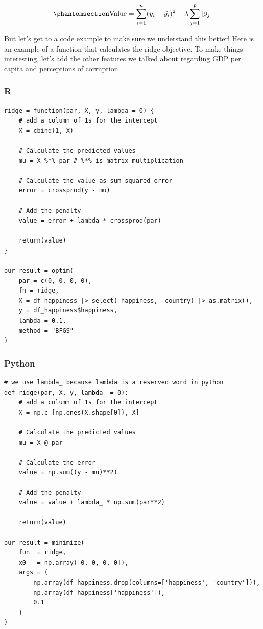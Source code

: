\documentclass[
  letterpaper,
]{krantz}
\begin{document}
\begin{equation}\phantomsection\label{eq-estim-lasso}{
\textrm{Value} = \sum_{i=1}^{n} (y_i - \hat{y_i})^2 + \lambda \sum_{j=1}^{p} |\beta_j|
}\end{equation}

But let's get to a code example to make sure we understand this better!
Here is an example of a function that calculates the ridge objective. To
make things interesting, let's add the other features we talked about
regarding GDP per capita and perceptions of corruption.

\subsubsection{R}

\begin{verbatim}
ridge = function(par, X, y, lambda = 0) {
    # add a column of 1s for the intercept
    X = cbind(1, X)

    # Calculate the predicted values
    mu = X %*% par # %*% is matrix multiplication

    # Calculate the value as sum squared error
    error = crossprod(y - mu)

    # Add the penalty
    value = error + lambda * crossprod(par)

    return(value)
}

our_result = optim(
    par = c(0, 0, 0, 0),
    fn = ridge,
    X = df_happiness |> select(-happiness, -country) |> as.matrix(),
    y = df_happiness$happiness,
    lambda = 0.1,
    method = "BFGS"
)
\end{verbatim}

\subsubsection{Python}

\begin{verbatim}
# we use lambda_ because lambda is a reserved word in python
def ridge(par, X, y, lambda_ = 0):
    # add a column of 1s for the intercept
    X = np.c_[np.ones(X.shape[0]), X]

    # Calculate the predicted values
    mu = X @ par
    
    # Calculate the error
    value = np.sum((y - mu)**2)
    
    # Add the penalty
    value = value + lambda_ * np.sum(par**2)
    
    return(value)

our_result = minimize(
    fun  = ridge,
    x0   = np.array([0, 0, 0, 0]),
    args = (
        np.array(df_happiness.drop(columns=['happiness', 'country'])),
        np.array(df_happiness['happiness']), 
        0.1
    )
)
\end{verbatim}
\end{document}
